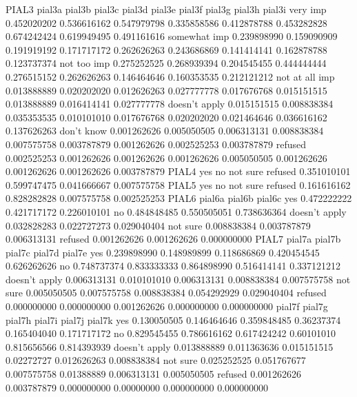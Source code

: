     PIAL3
                          pial3a      pial3b      pial3c      pial3d      pial3e      pial3f      pial3g      pial3h      pial3i
        very imp        0.452020202 0.536616162 0.547979798 0.335858586 0.412878788 0.453282828 0.674242424 0.619949495 0.491161616
        somewhat imp    0.239898990 0.159090909 0.191919192 0.171717172 0.262626263 0.243686869 0.141414141 0.162878788 0.123737374
        not too imp     0.275252525 0.268939394 0.204545455 0.444444444 0.276515152 0.262626263 0.146464646 0.160353535 0.212121212
        not at all imp  0.013888889 0.020202020 0.012626263 0.027777778 0.017676768 0.015151515 0.013888889 0.016414141 0.027777778
        doesn't apply   0.015151515 0.008838384 0.035353535 0.010101010 0.017676768 0.020202020 0.021464646 0.036616162 0.137626263
        don't know      0.001262626 0.005050505 0.006313131 0.008838384 0.007575758 0.003787879 0.001262626 0.002525253 0.003787879
        refused         0.002525253 0.001262626 0.001262626 0.001262626 0.005050505 0.001262626 0.001262626 0.001262626 0.003787879
    PIAL4
            yes         no        not sure      refused
        0.351010101 0.599747475 0.041666667 0.007575758
    PIAL5
            yes         no        not sure      refused
        0.161616162 0.828282828 0.007575758 0.002525253
    PIAL6
                            pial6a      pial6b      pial6c
        yes             0.472222222 0.421717172 0.226010101
        no              0.484848485 0.550505051 0.738636364
        doesn't apply   0.032828283 0.022727273 0.029040404
        not sure        0.008838384 0.003787879 0.006313131
        refused         0.001262626 0.001262626 0.000000000
    PIAL7
                            pial7a      pial7b      pial7c      pial7d      pial7e
        yes             0.239898990 0.148989899 0.118686869 0.420454545 0.626262626
        no              0.748737374 0.833333333 0.864898990 0.516414141 0.337121212
        doesn't apply   0.006313131 0.010101010 0.006313131 0.008838384 0.007575758
        not sure        0.005050505 0.007575758 0.008838384 0.054292929 0.029040404
        refused         0.000000000 0.000000000 0.001262626 0.000000000 0.000000000
                            pial7f      pial7g      pial7h     pial7i      pial7j      pial7k
        yes             0.130050505 0.146464646 0.359848485 0.36237374 0.165404040 0.171717172
        no              0.829545455 0.786616162 0.617424242 0.60101010 0.815656566 0.814393939
        doesn't apply   0.013888889 0.011363636 0.015151515 0.02272727 0.012626263 0.008838384
        not sure        0.025252525 0.051767677 0.007575758 0.01388889 0.006313131 0.005050505
        refused         0.001262626 0.003787879 0.000000000 0.00000000 0.000000000 0.000000000


